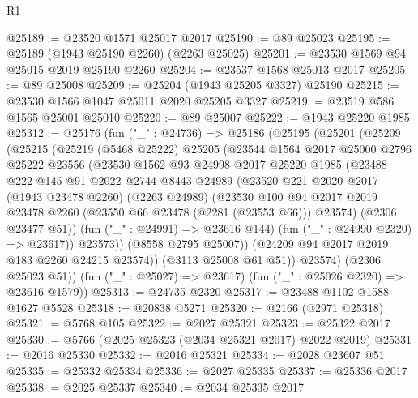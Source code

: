 \begin{lexlean}{R1}
\begin{coremodule}
@25189 := @23520 @1571 @25017 @2017
@25190 := @89 @25023
@25195 := @25189 (@1943 @25190 @2260) (@2263 @25025)
@25201 := @23530 @1569 @94 @25015 @2019 @25190 @2260
@25204 := @23537 @1568 @25013 @2017
@25205 := @89 @25008
@25209 := @25204 (@1943 @25205 @3327) @25190
@25215 := @23530 @1566 @1047 @25011 @2020 @25205 @3327
@25219 := @23519 @586 @1565 @25001 @25010
@25220 := @89 @25007
@25222 := @1943 @25220 @1985
@25312 := @25176
    (fun ("_" : @24736) =>
    @25186
      (@25195
        (@25201
          (@25209
            (@25215
              (@25219
                (@5468 @25222)
                @25205
                (@23544
                  @1564
                  @2017
                  @25000
                  @2796
                  @25222
                  @23556
                  (@23530
                    @1562
                    @93
                    @24998
                    @2017
                    @25220
                    @1985
                    (@23488
                      @222
                      @145
                      @91
                      @2022
                      @2744
                      @8443
                      @24989
                      (@23520
                        @221
                        @2020
                        @2017
                        (@1943 @23478 @2260)
                        (@2263 @24989)
                        (@23530
                          @100
                          @94
                          @2017
                          @2019
                          @23478
                          @2260
                          (@23550 @66 @23478 (@2281 (@23553 @66)))
                          @23574)
                        (@2306 @23477 @51))
                      (fun ("_" : @24991) => @23616 @144)
                      (fun ("_" : @24990 @2320) => @23617))
                    @23573))
                (@8558 @2795 @25007))
              (@24209 @94 @2017 @2019 @183 @2260 @24215 @23574))
            (@3113 @25008 @61 @51))
          @23574)
        (@2306 @25023 @51))
      (fun ("_" : @25027) => @23617)
      (fun ("_" : @25026 @2320) => @23616 @1579))
@25313 := @24735 @2320
@25317 := @23488 @1102 @1588 @1627 @5528
@25318 := @20838 @5271
@25320 := @2166 (@2971 @25318)
@25321 := @5768 @105
@25322 := @2027 @25321
@25323 := @25322 @2017
@25330 := @5766 (@2025 @25323 (@2034 @25321 @2017) @2022 @2019)
@25331 := @2016 @25330
@25332 := @2016 @25321
@25334 := @2028 @23607 @51
@25335 := @25332 @25334
@25336 := @2027 @25335
@25337 := @25336 @2017
@25338 := @2025 @25337
@25340 := @2034 @25335 @2017

\end{coremodule}
\end{lexlean}
